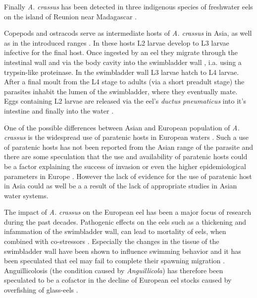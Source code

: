 Finally \textit{A. crassus} has been detected in three indigenous
species of freshwater eels on the island of Reunion near Madagascar
\cite{sasal_parasite_2008}.

Copepods and ostracods serve as intermediate hosts of
\textit{A. crassus} in Asia, as well as in the introduced ranges
\cite{moravec_first_2005}. In these hosts L2 larvae develop to L3
larvae infective for the final host. Once ingested by an eel they
migrate through the intestinal wall and via the body cavity into the
swimbladder wall \cite{haenen_effects_1996}, i.a. using a trypsin-like
proteinase\cite{polzer_identification_1993}. In the swimbladder wall
L3 larvae hatch to L4 larvae. After a final moult from the L4 stage to
adults (via a short preadult stage) the parasites inhabit the lumen of
the swimbladder, where they eventually mate. Eggs containing L2 larvae
are released via the eel's \textit{ductus pneumaticus} into it's
intestine and finally into the water \cite{de_charleroy_life_1990}.


One of the possible differences between Asian and European population
of \textit{A. crassus} is the widespread use of paratenic hosts in
European waters \cite{thomas_paratenic_1992,
  pietrock_dynamics_2002}. Such a use of paratenic hosts has not been
reported from the Asian range of the parasite and there are some
speculation that the use and availability of paratenic hosts could be
a factor explaining the success of invasion or even the higher
epidemiological parameters in Europe
\cite{thomas_paratenic_1992}. However the lack of evidence for the use
of paratenic host in Asia could as well be a a result of the lack of
appropriate studies in Asian water systems.

The impact of \textit{A. crassus} on the European eel has been a major
focus of research during the past decades. Pathogenic effects on the
eels such as a thickening \cite{wurtz_tara_2000} and infammation
\cite{beregi_radiodiagnostic_1998} of the swimbladder wall, can lead
to mortality of eels, when combined with co-stressors
\cite{gollock_physiological_2005}. Especially the changes in the
tissue of the swimbladder wall have been shown to influence swimming
behavior and it has been speculated that eel may fail to complete
their spawning migration \cite{palstra_swimming_2007}. Anguillicolosis
(the condition caused by \textit{Anguillicola}) has therefore been
speculated to be a cofactor in the decline of European eel stocks
\cite{sures_science_letter} caused by overfishing of glass-eels
\cite{pmid12713741}.

